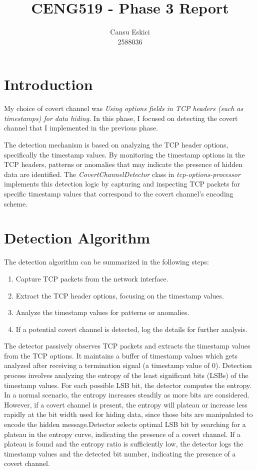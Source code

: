\documentclass[10pt,a4paper]{article}
\title{CENG519 - Phase 3 Report}
\author{
  Cansu Eskici\\
  2588036}
\begin{document}
\maketitle
\section*{Introduction}
My choice of covert channel was \textit{Using options fields in TCP headers (such as timestamps) for data hiding.} 
In this phase, I focused on detecting the covert channel that I implemented in the previous phase.  

The detection mechanism is based on analyzing the TCP header options, specifically the timestamp values.
 By monitoring the timestamp options in the TCP headers, patterns or anomalies that may indicate the presence of hidden data are identified.
  The \textit{CovertChannelDetector} class in \textit{tcp-options-processor} implements this detection logic by capturing and inspecting TCP packets for specific timestamp values that correspond to the covert channel's encoding scheme.

\section*{Detection Algorithm}
The detection algorithm can be summarized in the following steps:
\begin{enumerate}
    \item Capture TCP packets from the network interface.
    \item Extract the TCP header options, focusing on the timestamp values.
    \item Analyze the timestamp values for patterns or anomalies.
    \item If a potential covert channel is detected, log the details for further analysis.
\end{enumerate}

The detector passively observes TCP packets and extracts the timestamp values from the TCP options. 
It maintains a buffer of timestamp values which gets analyzed after receiving a termination signal (a timestamp value of 0).
Detection process involves analyzing the entropy of the least significant bits (LSBs) of the timestamp values. 
For each possible LSB bit, the detector computes the entropy. In a normal scenario, the entropy increases steadily as more bits are considered.
However, if a covert channel is present, the entropy will plateau or increase less rapidly at the bit width used for hiding data, since those bits are manipulated to encode the hidden message.Detector selects optimal LSB bit by searching for a plateau in the entropy curve, indicating the presence of a covert channel.
If a plateau is found and the entropy ratio is sufficiently low, the detector logs the timestamp values and the detected bit number, indicating the presence of a covert channel.
\end{document}
